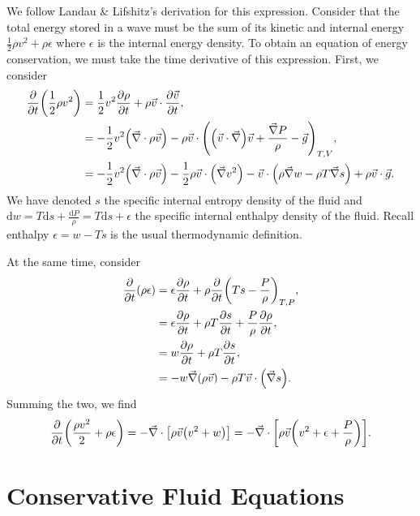 \documentclass[11pt,
        usenames, %
        dvipsnames %
    ]{report}
\newcommand*{\pd}[2]{\frac{\partial#1}{\partial#2}}
\DeclarePairedDelimiter\p{\lparen}{\rparen}
\DeclarePairedDelimiter\s{\lbrack}{\rbrack}
\begin{document}
We follow Landau \& Lifshitz's derivation for this expression. Consider that the
total energy stored in a wave must be the sum of its kinetic and internal energy
$\frac{1}{2}\rho v^2 + \rho \epsilon$ where $\epsilon$ is the internal energy
density. To obtain an equation of energy conservation, we must take the time
derivative of this expression. First, we consider
\begin{align}
    \pd{}{t}\p*{\frac{1}{2}\rho v^2} &= \frac{1}{2}v^2\pd{\rho}{t}
        + \rho \vec{v} \cdot \pd{\vec{v}}{t},\nonumber\\
        &= -\frac{1}{2}v^2 \p*{\vec{\nabla} \cdot \rho \vec{v}}
            - \rho \vec{v} \cdot \p*{
                \p*{\vec{v} \cdot \vec{\nabla}}\vec{v} +
                    \frac{\vec{\nabla}P}{\rho} - \vec{g}
            }_{T, V},\nonumber\\
        &= -\frac{1}{2} v^2 \p*{\vec{\nabla} \cdot \rho \vec{v}}
            - \frac{1}{2}\rho \vec{v} \cdot \p*{\vec{\nabla} v^2}
            - \vec{v} \cdot \p*{
                \rho \vec{\nabla} w - \rho T \vec{\nabla}s
            } + \rho \vec{v} \cdot \vec{g}.
\end{align}
We have denoted $s$ the specific internal entropy density of the fluid and
$\mathrm{d}w = T\mathrm{d}s + \frac{\mathrm{d}P}{\rho} = T\mathrm{d}s +
\epsilon$ the specific internal enthalpy density of the fluid.
Recall enthalpy $\epsilon = w - Ts$ is the usual thermodynamic definition.

At the same time, consider
\begin{align}
    \pd{}{t}\p*{\rho \epsilon} &= \epsilon \pd{\rho}{t}
        + \rho \pd{}{t}\p*{Ts - \frac{P}{\rho}}_{T, P},\nonumber\\
        &= \epsilon \pd{\rho}{t} + \rho T \pd{s}{t} + \frac{P}{\rho}\pd{\rho}{t}
            ,\nonumber\\
        &= w \pd{\rho}{t} + \rho T \pd{s}{t},\nonumber\\
        &= -w\vec{\nabla}\p*{\rho \vec{v}} - \rho T \vec{v} \cdot \p*{
            \vec{\nabla}s
        }.
\end{align}
Summing the two, we find
\begin{equation}
    \pd{}{t}\p*{\frac{\rho v^2}{2} + \rho \epsilon}
        = -\vec{\nabla} \cdot \s*{
            \rho \vec{v}\p*{v^2 + w}
        } = -\vec{\nabla} \cdot \s*{
            \rho \vec{v}\p*{v^2 + \epsilon + \frac{P}{\rho}}
        }.
\end{equation}

\section{Conservative Fluid Equations}
\end{document}
